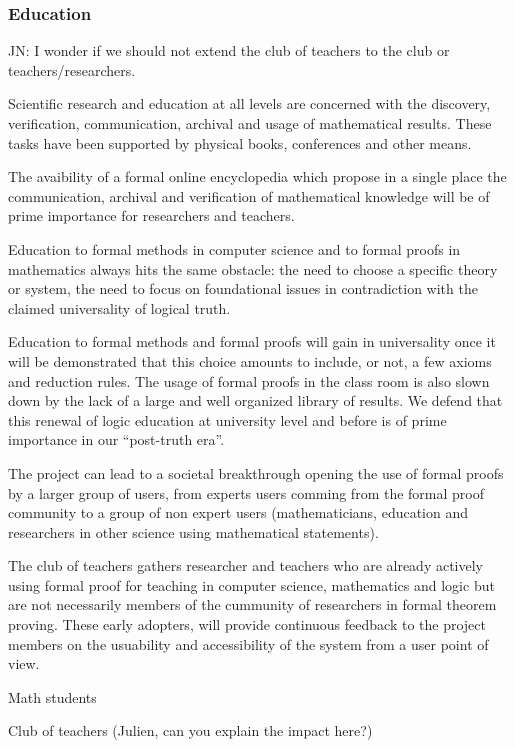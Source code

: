 \subsubsection{Education}

{\color{red} JN: I wonder if we should not extend the club of teachers to the club or teachers/researchers.}

Scientific research and education at all levels are concerned with the discovery, verification, communication, archival and usage of mathematical results.
These tasks have been supported by physical books, conferences and other means.

The avaibility of a formal online encyclopedia which propose in a single place the communication, archival and verification of mathematical  knowledge will be of prime importance for researchers and teachers.

Education to formal methods in computer science and to formal proofs
in mathematics always hits the same obstacle: the need to choose a
specific theory or system, the need to focus on foundational issues in contradiction with the claimed universality of logical truth. 

Education to formal methods and formal proofs will gain in universality once it will be demonstrated that this choice amounts to include, or not, a few axioms and reduction
rules. 
The usage of formal proofs in the class room is also slown down by the lack of a large and well organized library of results.
We defend that this renewal of logic education at university level and before is of prime importance in our ``post-truth era''.

The project can lead to a societal breakthrough opening the use of formal proofs by a larger group of users, from experts users comming from the formal proof community  to a group of non expert users (mathematicians, education and researchers in other science using mathematical statements). 

The club of teachers gathers researcher and teachers who are already actively using formal proof for teaching in computer science, mathematics and logic but are not necessarily members of the cummunity of researchers in formal theorem proving. These early adopters, will provide continuous feedback to the project members on the usuability and accessibility of the system from a user point of view.

Math students 

{\color{red} Club of teachers (Julien, can you explain the impact here?)}

